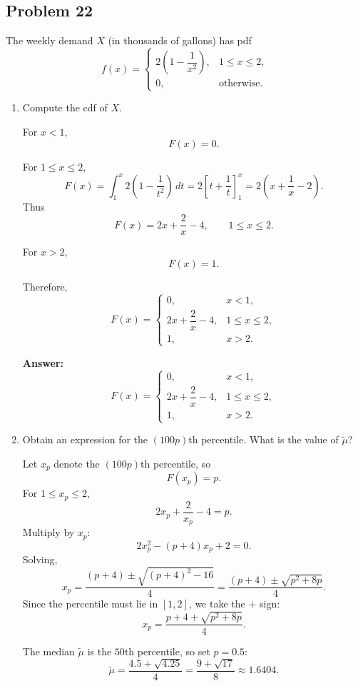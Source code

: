 \documentclass[11pt]{article}
\begin{document}
\subsection*{Problem 22}

The weekly demand \(X\) (in thousands of gallons) has pdf
\[
f(x)=
\begin{cases}
2\left(1-\dfrac{1}{x^2}\right), & 1\le x\le 2,\\[6pt]
0, & \text{otherwise.}
\end{cases}
\]

\begin{enumerate}
    \item[(a)] Compute the cdf of \(X\).

    For \(x<1\),
    \[
    F(x)=0.
    \]

    For \(1\le x\le 2\),
    \[
    F(x)=\int_1^x 2\left(1-\frac{1}{t^2}\right)\,dt
    =2\left[t+\frac{1}{t}\right]_1^x
    =2\left(x+\frac{1}{x}-2\right).
    \]
    Thus
    \[
    F(x)=2x+\frac{2}{x}-4, \qquad 1\le x\le 2.
    \]

    For \(x>2\),
    \[
    F(x)=1.
    \]

    Therefore,
    \[
    F(x)=
    \begin{cases}
    0, & x<1,\\[6pt]
    2x+\dfrac{2}{x}-4, & 1\le x\le 2,\\[8pt]
    1, & x>2.
    \end{cases}
    \]

    \textbf{Answer:}
    \[
    \boxed{
    F(x)=
    \begin{cases}
    0, & x<1,\\
    2x+\dfrac{2}{x}-4, & 1\le x\le 2,\\
    1, & x>2.
    \end{cases}}
    \]

    \item[(b)] Obtain an expression for the \((100p)\)th percentile. What is the value of \(\tilde{\mu}\)?

    Let \(x_p\) denote the \((100p)\)th percentile, so
    \[
    F(x_p)=p.
    \]
    For \(1\le x_p\le 2\),
    \[
    2x_p+\frac{2}{x_p}-4=p.
    \]
    Multiply by \(x_p\):
    \[
    2x_p^2-(p+4)x_p+2=0.
    \]
    Solving,
    \[
    x_p=\frac{(p+4)\pm \sqrt{(p+4)^2-16}}{4}
    =\frac{(p+4)\pm \sqrt{p^2+8p}}{4}.
    \]
    Since the percentile must lie in \([1,2]\), we take the \(+\) sign:
    \[
    x_p=\frac{p+4+\sqrt{p^2+8p}}{4}.
    \]

    The median \(\tilde{\mu}\) is the \(50\)th percentile, so set \(p=0.5\):
    \[
    \tilde{\mu}
    =\frac{4.5+\sqrt{4.25}}{4}
    =\frac{9+\sqrt{17}}{8}
    \approx 1.6404.
    \]


\end{enumerate}
\end{document}
